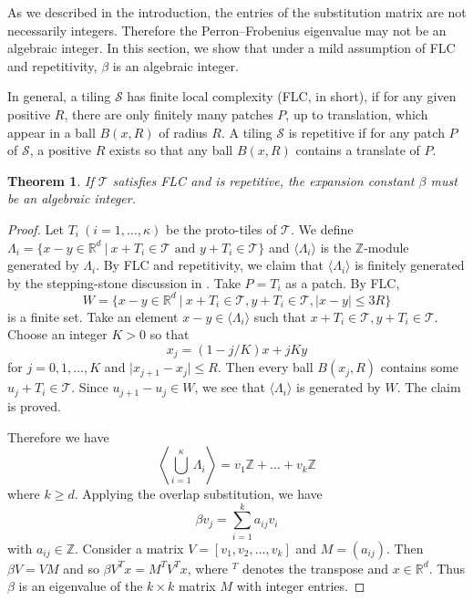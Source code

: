 \documentclass[a4]{amsart}
\newcommand{\R}{{\mathbb R}}
\newcommand{\Z}{{\mathbb Z}}
\newcommand{\T}{{\mathcal T}}
\newtheorem{theorem}{Theorem}[section]
\theoremstyle{definition}
\begin{document}
As we described in the introduction, the entries of the substitution matrix are not necessarily integers. Therefore the
Perron--Frobenius eigenvalue may not be an algebraic integer.
In this section, we show that under a mild assumption of FLC and repetitivity, $\beta$ is an
algebraic integer.

In general, a tiling $\mathcal{S}$ has finite local complexity (FLC, in short), if for any given positive $R$, there are only finitely many patches $P$, up to translation, which appear in a ball $B(x,R)$ of radius $R$.
A tiling $\mathcal{S}$ is repetitive if for any patch $P$ of $\mathcal{S}$, a positive $R$ exists so that any ball $B(x,R)$ contains a translate of $P$.



\begin{theorem}
If $\T$ satisfies FLC and is repetitive, the expansion constant $\beta$ must be an algebraic integer.
\end{theorem}

\begin{proof}
Let $T_i\ (i=1,\dots,\kappa)$ be the proto-tiles of $\T$. We define $\Lambda_i=\{ x-y\in \R^d\ |\ x+T_i \in \T \text{ and } y+T_i \in \T \}$
and $\langle\Lambda_i\rangle$ is the $\Z$-module generated by $\Lambda_i$. 
By FLC and repetitivity, we claim that 
$\langle\Lambda_i\rangle$ is finitely generated by the 
stepping-stone discussion in \cite{Lagarias:99}. 
Take $P=T_i$ as a patch. By FLC, 
$$
W=\{ x-y\in \R^d \ |\ x+T_i \in \T, y+T_i\in \T, \vert x-y \vert \le 3R \}
$$
is a finite set. Take
an element  $x-y\in \langle \Lambda_i \rangle$ such that $x+T_i \in \T, y+T_i \in \T$.
Choose an integer $K>0$ so that
$$
x_j=(1-j/K)x + j K y
$$
for $j=0,1,\dots,K$ and $\vert x_{j+1}-x_j \vert \le R$. Then every ball
$B(x_j,R)$ contains some $u_j+T_i\in \T$. Since $u_{j+1}-u_j\in W$, we see that
$\langle \Lambda_i \rangle$ is generated by $W$. The claim is proved. 

Therefore we have
$$
\left\langle\bigcup_{i=1}^{\kappa}\Lambda_i\right\rangle = v_1\Z +\dots + v_k \Z
$$
where $k\ge d$. Applying the overlap substitution, we have
$$
\beta v_j = \sum_{i=1}^k a_{ij} v_i
$$
with $a_{ij}\in \Z$. Consider a matrix $V=[v_1,v_2,\ldots, v_k]$ and
$M=(a_{ij})$.
Then $\beta V=VM$ and so
$\beta V^{T}x=M^{T}V^{T}x$, where
${}^{T}$ denotes the transpose
and $x\in\mathbb{R}^d$.
Thus $\beta$ is an eigenvalue of the $k\times k$ matrix $M$ with integer entries.
\end{proof}
\end{document}
